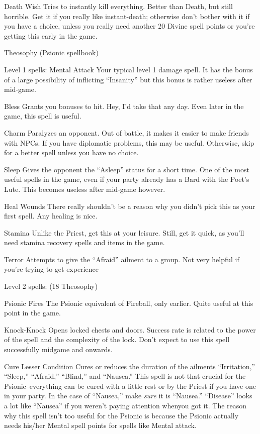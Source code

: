 \documentclass[12pt]{article}
\begin{document}
Death Wish Tries to instantly kill everything. Better than Death, but
still horrible. Get it if you really like instant-death; otherwise don't
bother with it if you have a choice, unless you really need another 20
Divine spell points or you're getting this early in the game.

Theosophy (Psionic spellbook)

Level 1 spells: Mental Attack Your typical level 1 damage spell. It has
the bonus of a large possibility of inflicting ``Insanity'' but this
bonus is rather useless after mid-game.

Bless Grants you bonuses to hit. Hey, I'd take that any day. Even later
in the game, this spell is useful.

Charm Paralyzes an opponent. Out of battle, it makes it easier to make
friends with NPCs. If you have diplomatic problems, this may be useful.
Otherwise, skip for a better spell unless you have no choice.

Sleep Gives the opponent the ``Asleep'' status for a short time. One of
the most useful spells in the game, even if your party already has a
Bard with the Poet's Lute. This becomes useless after mid-game however.

Heal Wounds There really shouldn't be a reason why you didn't pick this
as your first spell. Any healing is nice.

Stamina Unlike the Priest, get this at your leisure. Still, get it
quick, as you'll need stamina recovery spells and items in the game.

Terror Attempts to give the ``Afraid'' ailment to a group. Not very
helpful if you're trying to get experience

Level 2 spells: (18 Theosophy)

Psionic Fires The Psionic equivalent of Fireball, only earlier. Quite
useful at this point in the game.

Knock-Knock Opens locked chests and doors. Success rate is related to
the power of the spell and the complexity of the lock. Don't expect to
use this spell successfully midgame and onwards.

Cure Lesser Condition Cures or reduces the duration of the ailments
``Irritation,'' ``Sleep,'' ``Afraid,'' ``Blind,'' and ``Nausea.'' This
spell is not that crucial for the Psionic--everything can be cured with
a little rest or by the Priest if you have one in your party. In the
case of ``Nausea,'' make \emph{sure} it is ``Nausea.'' ``Disease'' looks
a lot like ``Nausea'' if you weren't paying attention whenyou got it.
The reason why this spell isn't too useful for the Psionic is because
the Psionic actually needs his/her Mental spell points for spells like
Mental attack.
\end{document}
